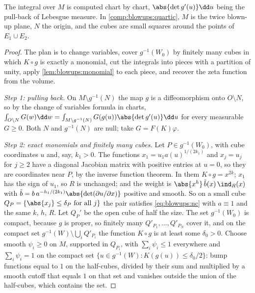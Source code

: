 \begin{refsection}
The integral over $M$ is computed chart by chart, $\abs{\det g'(u)}\dd u$ being the pull-back of Lebesgue measure. In \cref{comp:blowups:quartic}, $M$ is the twice blown-up plane, $N$ the origin, and the cubes are small squares around the points of $E_1\cup E_2$.

\begin{proof}
The plan is to change variables, cover $g^{-1}(W_0)$ by finitely many cubes in which $K\circ g$ is exactly a monomial, cut the integrals into pieces with a partition of unity, apply \cref{lem:blowups:monomial} to each piece, and recover the zeta function from the volume.

\emph{Step 1: pulling back.} On $M\setminus g^{-1}(N)$ the map $g$ is a diffeomorphism onto $O\setminus N$, so by the change of variables formula in charts, $\int_{O\setminus N}G(w)\dd w=\int_{M\setminus g^{-1}(N)}G(g(u))\abs{\det g'(u)}\dd u$ for every measurable $G\ge0$. Both $N$ and $g^{-1}(N)$ are null; take $G=F(K)\varphi$.

\emph{Step 2: exact monomials and finitely many cubes.} Let $P\in g^{-1}(W_0)$, with cube coordinates $u$ and, say, $k_1>0$. The functions $x_1=u_1a(u)^{1/(2k_1)}$ and $x_j=u_j$ for $j\ge2$ have a diagonal Jacobian matrix with positive entries at $u=0$, so they are coordinates near $P$, by the inverse function theorem. In them $K\circ g=x^{2k}$; $x_1$ has the sign of $u_1$, so $R$ is unchanged; and the weight is $\abs{x^h}\,\tilde b(x)\,\ind_R(x)$ with $\tilde b=b\,a^{-h_1/(2k_1)}\abs{\det(\partial u/\partial x)}$ positive and smooth. So on a small cube $Q_P=\{\abs{x_j}\le\delta_P\text{ for all }j\}$ the pair satisfies \eqref{eq:blowups:nc} with $a\equiv1$ and the same $k$, $h$, $R$. Let $Q_P'$ be the open cube of half the size. The set $g^{-1}(W_0)$ is compact, because $g$ is proper, so finitely many $Q'_{P_1},\dots,Q'_{P_N}$ cover it, and on the compact set $g^{-1}(W)\setminus\bigcup_iQ'_{P_i}$ the function $K\circ g$ is at least some $\delta_0>0$. Choose smooth $\psi_i\ge0$ on $M$, supported in $Q_{P_i}$, with $\sum_i\psi_i\le1$ everywhere and $\sum_i\psi_i=1$ on the compact set $\{u\in g^{-1}(W):K(g(u))\le\delta_0/2\}$: bump functions equal to $1$ on the half-cubes, divided by their sum and multiplied by a smooth cutoff that equals $1$ on that set and vanishes outside the union of the half-cubes, which contains the set.


\end{proof}
\end{refsection}

